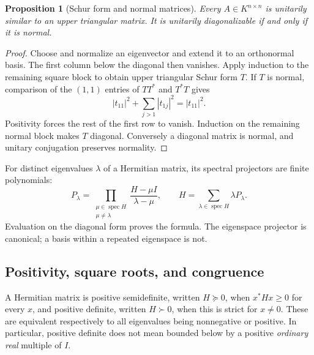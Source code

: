 \documentclass[11pt,a4paper]{article}
\numberwithin{equation}{section}
\newtheorem{proposition}[proposition]{Proposition}
\theoremstyle{definition}
\theoremstyle{remark}
\newcommand{\spec}{\operatorname{spec}}
\begin{document}
\begin{proposition}[Schur form and normal matrices]\label{prop:normal}
Every $A\in K^{n\times n}$ is unitarily similar to an upper triangular
matrix. It is unitarily diagonalizable if and only if it is normal.
\end{proposition}
\begin{proof}
Choose and normalize an eigenvector and extend it to an orthonormal basis.
The first column below the diagonal then vanishes. Apply induction to the
remaining square block to obtain upper triangular Schur form $T$.
If $T$ is normal, comparison of the $(1,1)$ entries of $TT^*$ and $T^*T$
gives
\[
 |t_{11}|^2+\sum_{j>1}|t_{1j}|^2=|t_{11}|^2.
\]
Positivity forces the rest of the first row to vanish. Induction on the
remaining normal block makes $T$ diagonal. Conversely a diagonal matrix is
normal, and unitary conjugation preserves normality.
\end{proof}

For distinct eigenvalues $\lambda$ of a Hermitian matrix, its spectral
projectors are finite polynomials:
\begin{equation}\label{eq:spectralprojector}
 P_\lambda=\prod_{\substack{\mu\in\spec H\\\mu\ne\lambda}}
       \frac{H-\mu I}{\lambda-\mu},
 \qquad H=\sum_{\lambda\in\spec H}\lambda P_\lambda.
\end{equation}
Evaluation on the diagonal form proves the formula. The eigenspace
projector is canonical; a basis within a repeated eigenspace is not.

\subsection{Positivity, square roots, and congruence}
A Hermitian matrix is positive semidefinite, written $H\succeq0$, when
$x^*Hx\ge0$ for every $x$, and positive definite, written $H\succ0$, when
this is strict for $x\ne0$. These are equivalent respectively to all
eigenvalues being nonnegative or positive. In particular, positive definite
does not mean bounded below by a positive \emph{ordinary real} multiple of
$I$.
\end{document}
